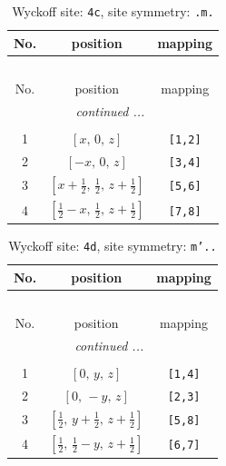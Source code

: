 \documentclass[fleqn,8pt]{jsarticle}
\begin{document}
\renewcommand{\arraystretch}{1.2}
\begin{longtable}{ccc}
\caption{Wyckoff site: {\tt 4c}, site symmetry: {\tt .m.}}
 \\
 \hline \hline
No. & position & mapping \\ \hline \endfirsthead

\multicolumn{2}{l}{\tablename\ \thetable{}} \\
 \hline \hline
No. & position & mapping \\ \hline \endhead

 \hline \hline
\multicolumn{2}{r}{\footnotesize\it continued ...} \\ \endfoot

 \hline \hline
\multicolumn{2}{r}{} \\ \endlastfoot

1 & $\left[ x,\, 0,\, z \right]$ & {\tt [1,2]} \\ \hline
2 & $\left[ - x,\, 0,\, z \right]$ & {\tt [3,4]} \\ \hline
3 & $\left[ x + \frac{1}{2},\, \frac{1}{2},\, z + \frac{1}{2} \right]$ & {\tt [5,6]} \\ \hline
4 & $\left[ \frac{1}{2} - x,\, \frac{1}{2},\, z + \frac{1}{2} \right]$ & {\tt [7,8]} \\
\end{longtable}
\renewcommand{\arraystretch}{1.2}
\begin{longtable}{ccc}
\caption{Wyckoff site: {\tt 4d}, site symmetry: {\tt m'..}}
 \\
 \hline \hline
No. & position & mapping \\ \hline \endfirsthead

\multicolumn{2}{l}{\tablename\ \thetable{}} \\
 \hline \hline
No. & position & mapping \\ \hline \endhead

 \hline \hline
\multicolumn{2}{r}{\footnotesize\it continued ...} \\ \endfoot

 \hline \hline
\multicolumn{2}{r}{} \\ \endlastfoot

1 & $\left[ 0,\, y,\, z \right]$ & {\tt [1,4]} \\ \hline
2 & $\left[ 0,\, - y,\, z \right]$ & {\tt [2,3]} \\ \hline
3 & $\left[ \frac{1}{2},\, y + \frac{1}{2},\, z + \frac{1}{2} \right]$ & {\tt [5,8]} \\ \hline
4 & $\left[ \frac{1}{2},\, \frac{1}{2} - y,\, z + \frac{1}{2} \right]$ & {\tt [6,7]} \\
\end{longtable}
\end{document}
